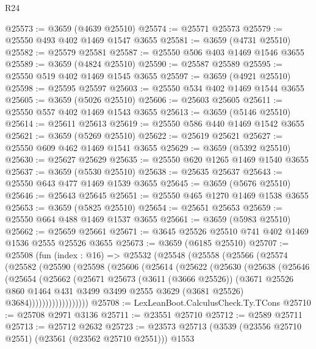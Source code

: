 \begin{lexlean}{R24}
\begin{coremodule}
@25573 := @3659 (@4639 @25510)
@25574 := @25571 @25573
@25579 := @25550 @493 @402 @1469 @1547 @3655
@25581 := @3659 (@4731 @25510)
@25582 := @25579 @25581
@25587 := @25550 @506 @403 @1469 @1546 @3655
@25589 := @3659 (@4824 @25510)
@25590 := @25587 @25589
@25595 := @25550 @519 @402 @1469 @1545 @3655
@25597 := @3659 (@4921 @25510)
@25598 := @25595 @25597
@25603 := @25550 @534 @402 @1469 @1544 @3655
@25605 := @3659 (@5026 @25510)
@25606 := @25603 @25605
@25611 := @25550 @557 @402 @1469 @1543 @3655
@25613 := @3659 (@5146 @25510)
@25614 := @25611 @25613
@25619 := @25550 @586 @440 @1469 @1542 @3655
@25621 := @3659 (@5269 @25510)
@25622 := @25619 @25621
@25627 := @25550 @609 @462 @1469 @1541 @3655
@25629 := @3659 (@5392 @25510)
@25630 := @25627 @25629
@25635 := @25550 @620 @1265 @1469 @1540 @3655
@25637 := @3659 (@5530 @25510)
@25638 := @25635 @25637
@25643 := @25550 @643 @477 @1469 @1539 @3655
@25645 := @3659 (@5676 @25510)
@25646 := @25643 @25645
@25651 := @25550 @465 @1270 @1469 @1538 @3655
@25653 := @3659 (@5825 @25510)
@25654 := @25651 @25653
@25659 := @25550 @664 @488 @1469 @1537 @3655
@25661 := @3659 (@5983 @25510)
@25662 := @25659 @25661
@25671 := @3645 @25526 @25510 @741 @402 @1469 @1536 @2555 @25526 @3655
@25673 := @3659 (@6185 @25510)
@25707 := @25508
    (fun (index : @16) =>
    @25532
      (@25548
        (@25558
          (@25566
            (@25574
              (@25582
                (@25590
                  (@25598
                    (@25606
                      (@25614
                        (@25622
                          (@25630
                            (@25638
                              (@25646
                                (@25654
                                  (@25662
                                    (@25671
                                      @25673
                                      (@3611 (@3666 @25526))
                                      (@3671
                                        @25526
                                        @860
                                        @1464
                                        @431
                                        @3499
                                        @3499
                                        @2555
                                        @3629
                                        (@3681 @25526)
                                        @3684))))))))))))))))))
@25708 := LexLeanBoot.CalculusCheck.Ty.TCons
@25710 := @25708 @2971 @3136
@25711 := @23551 @25710
@25712 := @2589 @25711
@25713 := @25712 @2632
@25723 := @23573 @25713 (@3539 (@23556 @25710 @2551) (@23561 (@23562 @25710 @2551))) @1553

\end{coremodule}
\end{lexlean}
